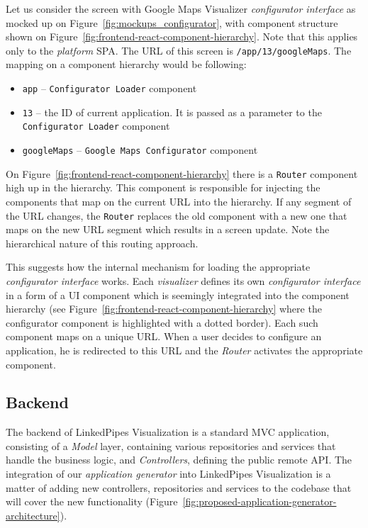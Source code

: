 Let us consider the screen with Google Maps Visualizer \emph{configurator interface} as mocked up on Figure~\ref{fig:mockups_configurator}, with component structure shown on Figure~\ref{fig:frontend-react-component-hierarchy}. Note that this applies only to the \emph{platform} SPA. The URL of this screen is \texttt{/app/13/googleMaps}. The mapping on a component hierarchy would be following:

\begin{itemize}
\item \texttt{app} -- \texttt{Configurator Loader} component
\item \texttt{13} -- the ID of current application. It is passed as a parameter to the \texttt{Configurator Loader} component
\item \texttt{googleMaps} -- \texttt{Google Maps Configurator} component
\end{itemize}

On Figure~\ref{fig:frontend-react-component-hierarchy} there is a \texttt{Router} component high up in the hierarchy. This component is responsible for injecting the components that map on the current URL into the hierarchy. If any segment of the URL changes, the \texttt{Router} replaces the old component with a new one that maps on the new URL segment which results in a screen update. Note the hierarchical nature of this routing approach. 

This suggests how the internal mechanism for loading the appropriate \emph{configurator interface} works. Each \emph{visualizer} defines its own \emph{configurator interface} in a form of a UI component which is seemingly integrated into the component hierarchy (see Figure~\ref{fig:frontend-react-component-hierarchy} where the configurator component is highlighted with a dotted border). Each such component maps on a unique URL. When a user decides to configure an application, he is redirected to this URL and the \emph{Router} activates the appropriate component. 

\subsection{Backend}

The backend of LinkedPipes Visualization is a standard MVC application, consisting of a \emph{Model} layer, containing various repositories and services that handle the business logic, and \emph{Controllers}, defining the public remote API. The integration of our \emph{application generator} into LinkedPipes Visualization is a matter of adding new controllers, repositories and services to the codebase that will cover the new functionality (Figure~\ref{fig:proposed-application-generator-architecture}).

